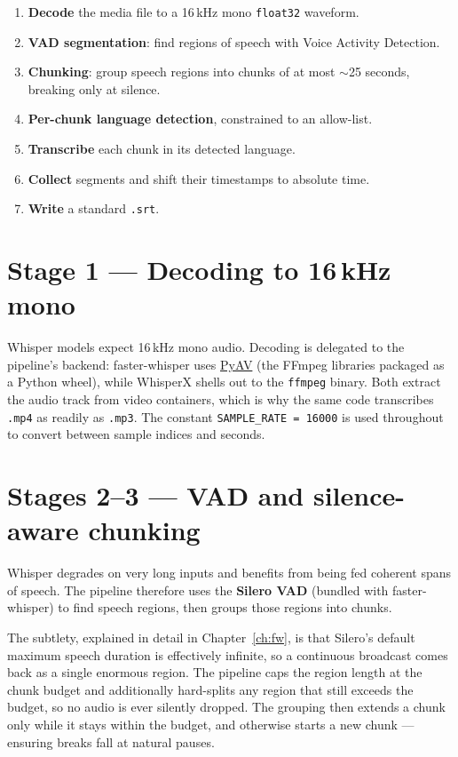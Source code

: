 \documentclass[11pt,a4paper]{report}
\newcommand{\code}[1]{\texttt{\small #1}}
\begin{document}
\begin{enumerate}[leftmargin=1.6em]
  \item \textbf{Decode} the media file to a 16\,kHz mono \code{float32} waveform.
  \item \textbf{VAD segmentation}: find regions of speech with Voice Activity
        Detection.
  \item \textbf{Chunking}: group speech regions into chunks of at most $\sim$25
        seconds, breaking only at silence.
  \item \textbf{Per-chunk language detection}, constrained to an allow-list.
  \item \textbf{Transcribe} each chunk in its detected language.
  \item \textbf{Collect} segments and shift their timestamps to absolute time.
  \item \textbf{Write} a standard \texttt{.srt}.
\end{enumerate}

\section{Stage 1 --- Decoding to 16\,kHz mono}

Whisper models expect 16\,kHz mono audio. Decoding is delegated to the
pipeline's backend: faster-whisper uses \href{https://pyav.org/}{PyAV} (the FFmpeg
libraries packaged as a Python wheel), while WhisperX shells out to the
\code{ffmpeg} binary. Both extract the audio track from video containers, which is
why the same code transcribes \code{.mp4} as readily as \code{.mp3}. The constant
\code{SAMPLE\_RATE = 16000} is used throughout to convert between sample indices
and seconds.

\section{Stages 2--3 --- VAD and silence-aware chunking}

Whisper degrades on very long inputs and benefits from being fed coherent spans of
speech. The pipeline therefore uses the \textbf{Silero VAD} (bundled with
faster-whisper) to find speech regions, then groups those regions into chunks.

The subtlety, explained in detail in Chapter~\ref{ch:fw}, is that Silero's default
maximum speech duration is effectively infinite, so a continuous broadcast comes
back as a single enormous region. The pipeline caps the region length at the chunk
budget and additionally hard-splits any region that still exceeds the budget, so
no audio is ever silently dropped. The grouping then extends a chunk only while it
stays within the budget, and otherwise starts a new chunk --- ensuring breaks fall
at natural pauses.
\end{document}
